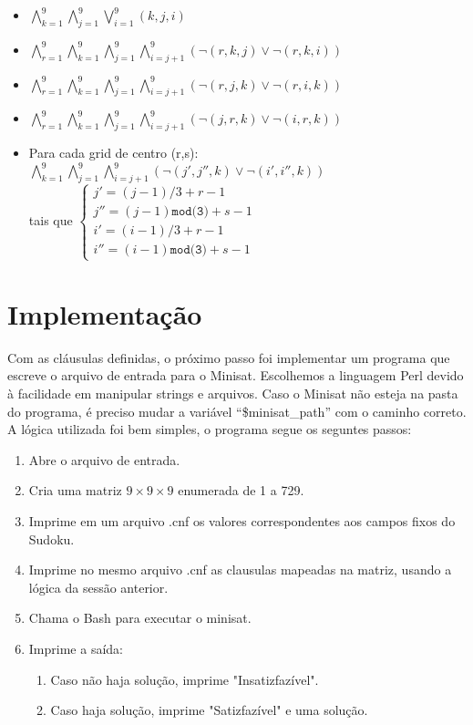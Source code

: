 \documentclass[
	article,			
	11pt,				
	oneside,			
	a4paper,			
	english,			
	brazil,				
	]{abntex2}
\begin{document}
\begin{itemize}
\item $\bigwedge_{k=1}^9\bigwedge_{j=1}^9\bigvee_{i=1}^9 (k,j,i)$  
\item $\bigwedge_{r=1}^9\bigwedge_{k=1}^9\bigwedge_{j=1}^9\bigwedge_{i=j+1}^9 (\neg(r,k,j)\vee\neg(r,k,i))$
\item $\bigwedge_{r=1}^9\bigwedge_{k=1}^9\bigwedge_{j=1}^9\bigwedge_{i=j+1}^9 (\neg(r,j,k)\vee\neg(r,i,k))$
\item $\bigwedge_{r=1}^9\bigwedge_{k=1}^9\bigwedge_{j=1}^9\bigwedge_{i=j+1}^9 (\neg(j,r,k)\vee\neg(i,r,k))$
\item Para cada grid de centro (r,s): $\bigwedge_{k=1}^9\bigwedge_{j=1}^9\bigwedge_{i=j+1}^9 (\neg(j',j'',k) \vee \neg(i',i'',k))$ \\tais que 
$\begin{cases}
j' = (j-1)/3+r-1 \\
j'' = (j-1)\texttt{mod(3)}+s-1 \\
i' = (i-1)/3+r-1 \\
i'' = (i-1)\texttt{mod(3)}+s-1
 \end{cases}$
\end{itemize}
\newpage
\section{Implementação}
Com as cláusulas definidas, o próximo passo foi implementar um programa que escreve o arquivo de entrada para o Minisat.
Escolhemos a linguagem Perl devido à facilidade em manipular strings e arquivos.
Caso o Minisat não esteja na pasta do programa, é preciso mudar a variável ``\$minisat\_path'' com o caminho correto.
A lógica utilizada foi bem simples, o programa segue os seguntes passos:
\begin{enumerate}
\item Abre o arquivo de entrada.
\item Cria uma matriz $9 \times 9 \times 9$ enumerada de 1 a 729.
\item Imprime em um arquivo .cnf os valores correspondentes aos campos fixos do Sudoku.
\item Imprime no mesmo arquivo .cnf as clausulas mapeadas na matriz, usando a lógica da sessão anterior.
\item Chama o Bash para executar o minisat.
\item Imprime a saída: 
\begin{enumerate}
\item Caso não haja solução, imprime "Insatizfazível".
\item Caso haja solução, imprime "Satizfazível" e uma solução.
\end{enumerate}
\end{enumerate}
\end{document}
